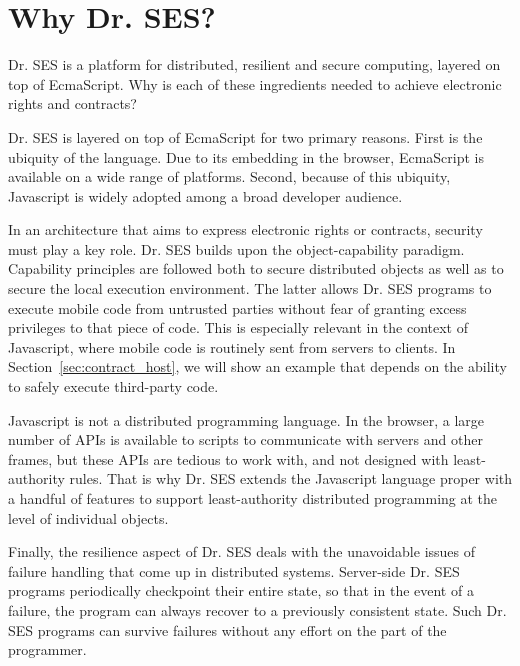 \documentclass{llncs}
\begin{document}
\section{Why Dr. SES?}

Dr. SES is a platform for distributed, resilient and secure computing, layered on top of EcmaScript. Why is each of these ingredients needed to achieve electronic rights and contracts?

Dr. SES is layered on top of EcmaScript for two primary reasons. First is the ubiquity of the language. Due to its embedding in the browser, EcmaScript is available on a wide range of platforms. Second, because of this ubiquity, Javascript is widely adopted among a broad developer audience.

In an architecture that aims to express electronic rights or contracts, security must play a key role. Dr. SES builds upon the object-capability paradigm. Capability principles are followed both to secure distributed objects as well as to secure the local execution environment. The latter allows Dr. SES programs to execute mobile code from untrusted parties without fear of granting excess privileges to that piece of code. This is especially relevant in the context of Javascript, where mobile code is routinely sent from servers to clients. In Section~\ref{sec:contract_host}, we will show an example that  depends on the ability to safely execute third-party code.

Javascript is not a distributed programming language. In the browser, a large number of APIs is available to scripts to communicate with servers and other frames, but these APIs are tedious to work with, and not designed with least-authority rules. That is why Dr. SES extends the Javascript language proper with a handful of features to support least-authority distributed programming at the level of individual objects.

Finally, the resilience aspect of Dr. SES deals with the unavoidable issues of failure handling that come up in distributed systems.
Server-side Dr. SES programs periodically checkpoint their entire state, so that in the event of a failure, the program can always recover to a previously consistent state. Such Dr. SES programs can survive failures without any effort on the part of the programmer.
\end{document}
